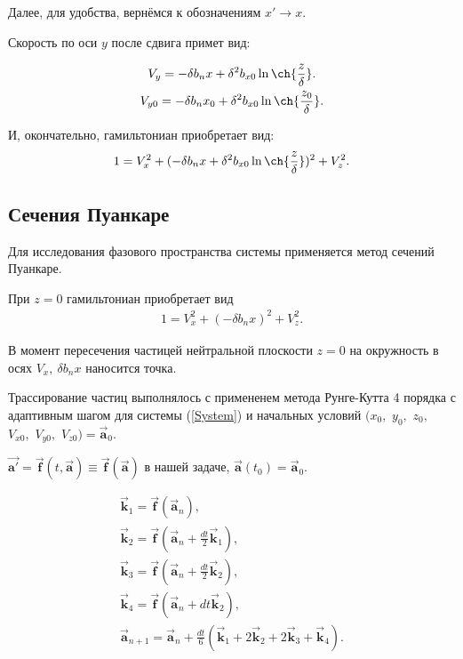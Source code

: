 \documentclass[12pt]{article}
\begin{document}
Далее, для удобства, вернёмся к обозначениям $x' \rightarrow x$.

Скорость по оси $y$ после сдвига примет вид:

\begin{gather}
V_y = - \delta b_n x + \delta^2 b_{x0} \ln{ \ch {\frac{z}{\delta} }}.\\
V_{y0} = - \delta b_n x_0 + \delta^2 b_{x0} \ln{ \ch {\frac{z_0}{\delta} }}.
\end{gather}

И, окончательно, гамильтониан приобретает вид:
\begin{gather}
1 = V^2_x + (- \delta b_n x + \delta^2 b_{x0} \ln{ \ch {\frac{z}{\delta} }})^2 + V^2_z. 
\label{Hamiltonian}
\end{gather}

\subsection{Сечения Пуанкаре}

Для исследования фазового пространства системы применяется метод сечений Пуанкаре. 

При $z=0$ гамильтониан приобретает вид 
\begin{gather}
1 = V^2_x + (- \delta b_n x)^2 + V^2_z. 
\label{HamiltonianPoincare}
\end{gather}

В момент пересечения частицей нейтральной плоскости $z=0$ на окружность в осях $V_x,\ \delta b_n x$ наносится точка.

Трассирование частиц выполнялось с примененем метода Рунге-Кутта 4 порядка с адаптивным шагом для системы (\ref{System}) и начальных условий $(x_0,$ $y_0,$ $z_0,$ $V_{x0},$ $V_{y0},$ $V_{z0}) = \vec{\mathbf {a}}_0$.

$\vec{\mathbf {a'}} = \vec{\mathbf {f}}(t, \vec{\mathbf {a}}) \equiv \vec{\mathbf {f}}(\vec{\mathbf {a}})$ в нашей задаче, $\vec{\mathbf {a}}(t_0)=\vec{\mathbf {a}}_0$.


\begin{gather*}
\vec{\mathbf {k}}_1 = \vec{\mathbf {f}}(\vec{\mathbf {a}}_{n}), \\
\vec{\mathbf {k}}_2 = \vec{\mathbf {f}}(\vec{\mathbf {a}}_{n} + \frac{dt}{2}\vec{\mathbf {k}}_1), \\
\vec{\mathbf {k}}_3 = \vec{\mathbf {f}}(\vec{\mathbf {a}}_{n} + \frac{dt}{2}\vec{\mathbf {k}}_2), \\
\vec{\mathbf {k}}_4 = \vec{\mathbf {f}}(\vec{\mathbf {a}}_{n} + dt\vec{\mathbf {k}}_2), \\
\vec{\mathbf {a}}_{n+1} = \vec{\mathbf {a}}_{n} + \frac{dt}{6}(\vec{\mathbf {k}}_1 + 2\vec{\mathbf {k}}_2 + 2\vec{\mathbf {k}}_3 + \vec{\mathbf {k}}_4).
\end{gather*}
\end{document}
